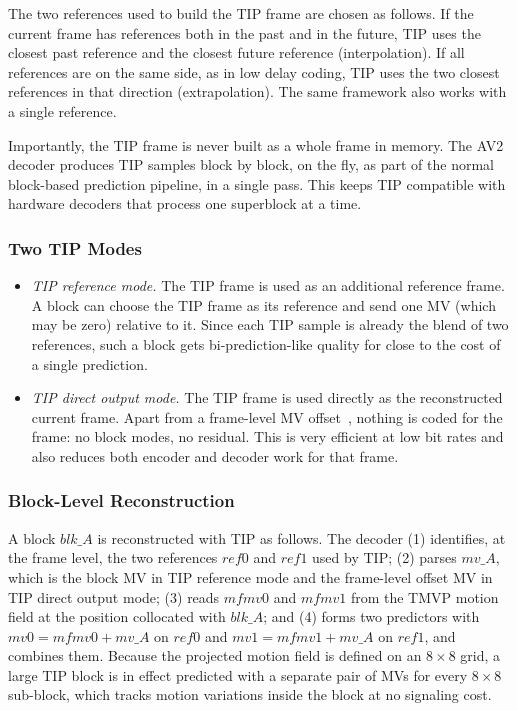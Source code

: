 \documentclass[journal]{IEEEtran}
\begin{document}
The two references used to build the TIP frame are chosen as follows. If the
current frame has references both in the past and in the future, TIP uses the
closest past reference and the closest future reference (interpolation). If
all references are on the same side, as in low delay coding, TIP uses the two
closest references in that direction (extrapolation). The same framework also
works with a single reference.

Importantly, the TIP frame is never built as a whole frame in memory. The AV2
decoder produces TIP samples block by block, on the fly, as part of the normal
block-based prediction pipeline, in a single pass. This keeps TIP compatible
with hardware decoders that process one superblock at a time.

\subsubsection{Two TIP Modes}
\begin{itemize}
  \item \emph{TIP reference mode.} The TIP frame is used as an additional
        reference frame. A block can choose the TIP frame as its reference and
        send one MV (which may be zero) relative to it. Since each TIP sample
        is already the blend of two references, such a block gets
        bi-prediction-like quality for close to the cost of a single
        prediction.
  \item \emph{TIP direct output mode.} The TIP frame is used directly as the
        reconstructed current frame. Apart from a frame-level MV
        offset~\cite{cwgD063}, nothing is coded for the frame: no block modes, no residual. This is
        very efficient at low bit rates and also reduces both encoder and
        decoder work for that frame.
\end{itemize}

\subsubsection{Block-Level Reconstruction}
A block $blk\_A$ is reconstructed with
TIP as follows. The decoder (1) identifies, at the frame level, the two references
$ref0$ and $ref1$ used by TIP; (2) parses $mv\_A$, which is the block MV in
TIP reference mode and the frame-level offset MV in TIP direct output mode;
(3) reads $mfmv0$ and $mfmv1$ from the TMVP motion field at the position
collocated with $blk\_A$; and (4) forms two predictors with
$mv0 = mfmv0 + mv\_A$ on $ref0$ and $mv1 = mfmv1 + mv\_A$ on $ref1$, and
combines them.
Because the projected motion field is defined on an $8{\times}8$ grid, a large
TIP block is in effect predicted with a separate pair of MVs for every
$8{\times}8$ sub-block, which tracks motion variations inside the block at no
signaling cost.
\end{document}
